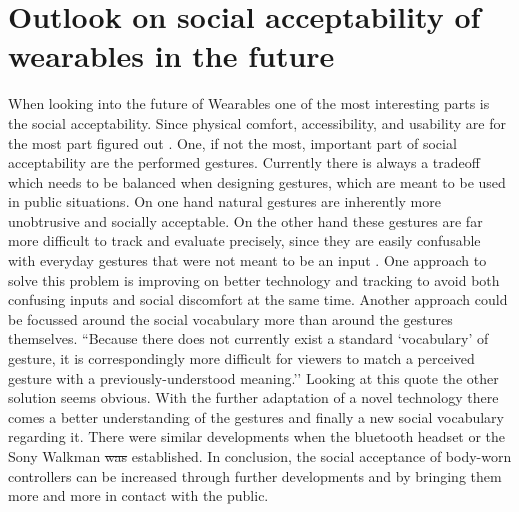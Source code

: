 \documentclass{sigchi}
\providecommand{\DIFaddtex}[1]{{\protect\color{blue}\uwave{#1}}} %
\providecommand{\DIFdeltex}[1]{{\protect\color{red}\sout{#1}}}                      %
\providecommand{\DIFaddbegin}{} %
\providecommand{\DIFaddend}{} %
\providecommand{\DIFdelbegin}{} %
\providecommand{\DIFdelend}{} %
\providecommand{\DIFadd}[1]{\texorpdfstring{\DIFaddtex{#1}}{#1}} %
\providecommand{\DIFdel}[1]{\texorpdfstring{\DIFdeltex{#1}}{}} %
\newcommand{\DIFscaledelfig}{0.5}
\newlength{\DIFdelgraphicswidth} %
\newlength{\DIFdelgraphicsheight} %
\newcommand{\DIFaddincludegraphics}[2][]{{\color{blue}\fbox{\DIFOincludegraphics[#1]{#2}}}} %
\newcommand{\DIFdelincludegraphics}[2][]{%
\sbox{\DIFdelgraphicsbox}{\DIFOincludegraphics[#1]{#2}}%
\settoboxwidth{\DIFdelgraphicswidth}{\DIFdelgraphicsbox} %
\settoboxtotalheight{\DIFdelgraphicsheight}{\DIFdelgraphicsbox} %
\scalebox{\DIFscaledelfig}{%
\parbox[b]{\DIFdelgraphicswidth}{\usebox{\DIFdelgraphicsbox}\\[-\baselineskip] \rule{\DIFdelgraphicswidth}{0em}}\llap{\resizebox{\DIFdelgraphicswidth}{\DIFdelgraphicsheight}{%
\setlength{\unitlength}{\DIFdelgraphicswidth}%
\begin{picture}(1,1)%
\thicklines\linethickness{2pt} %
{\color[rgb]{1,0,0}\put(0,0){\framebox(1,1){}}}%
{\color[rgb]{1,0,0}\put(0,0){\line( 1,1){1}}}%
{\color[rgb]{1,0,0}\put(0,1){\line(1,-1){1}}}%
\end{picture}%
}\hspace*{3pt}}} %
} %
\DeclareRobustCommand{\DIFaddbegin}{\DIFOaddbegin \let\includegraphics\DIFaddincludegraphics} %
\DeclareRobustCommand{\DIFaddend}{\DIFOaddend \let\includegraphics\DIFOincludegraphics} %
\DeclareRobustCommand{\DIFdelbegin}{\DIFOdelbegin \let\includegraphics\DIFdelincludegraphics} %
\DeclareRobustCommand{\DIFdelend}{\DIFOaddend \let\includegraphics\DIFOincludegraphics} %
\begin{document}
\section{Outlook on social acceptability of wearables in the future}
When looking into the future of Wearables one of the most interesting parts is the social acceptability. Since physical comfort, accessibility, and usability are for the most part figured out \cite{social-comfort}.
One, if not the most, important part of social acceptability are the performed gestures. Currently there is always a tradeoff which needs to be balanced when designing gestures, which are meant to be used in public situations. On one hand natural gestures are inherently more unobtrusive and socially acceptable. On the other hand these gestures are far more difficult to track and evaluate precisely, since they are easily confusable with everyday gestures that were not meant to be an input \cite{social-comfort}.
One approach to solve this problem is improving on better technology and tracking to avoid both confusing inputs and social discomfort at the same time. Another approach could be focussed around the social vocabulary more than around the gestures themselves.
``Because there does not currently exist a standard `vocabulary’ of gesture, it is correspondingly more difficult for viewers to match a perceived gesture with a previously-understood meaning.'' \cite[p. 4160]{social-comfort} %
Looking at this quote the other solution seems obvious. With the further adaptation of a novel technology there comes a better understanding of the gestures and finally a new social vocabulary regarding it. There were similar developments when the bluetooth headset \cite{social-comfort} or the Sony Walkman \cite{touch-wrist} \DIFdelbegin \DIFdel{was }\DIFdelend \DIFaddbegin \DIFadd{were }\DIFaddend established.
In conclusion, the social acceptance of body-worn controllers can be increased through further developments and by bringing them more and more in contact with the public.

% 


\end{document}

